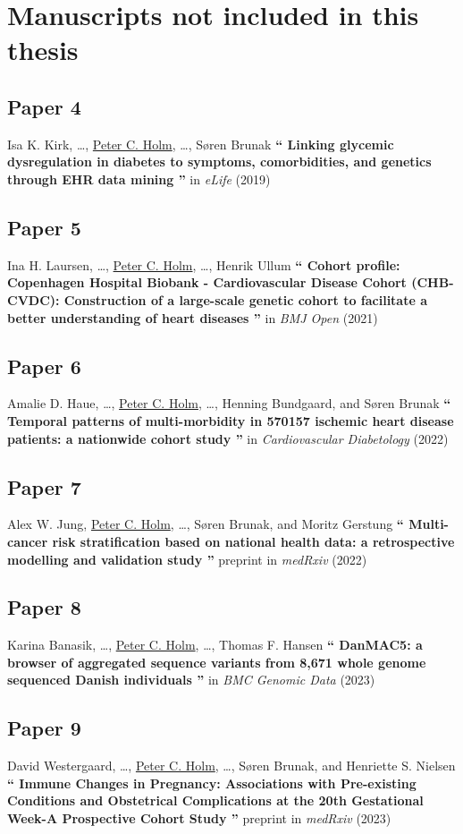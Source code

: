 \clearpage
\section{Manuscripts not included in this thesis}

\subsection{Paper 4}
Isa K. Kirk, \ldots, 
\underline{Peter C. Holm},
\ldots, Søren Brunak
\textbf{\enquote{%
    Linking glycemic dysregulation in diabetes to symptoms, 
    comorbidities, and genetics through EHR data mining
}}
in \textit{eLife} (2019)

\subsection{Paper 5}
Ina H. Laursen, \ldots, 
\underline{Peter C. Holm},
\ldots, Henrik Ullum
\textbf{\enquote{%
    Cohort profile: Copenhagen Hospital Biobank - Cardiovascular Disease Cohort
    (CHB-CVDC): Construction of a large-scale genetic cohort to facilitate a
    better understanding of heart diseases
}}
in \textit{BMJ Open} (2021)

\subsection{Paper 6}
Amalie D. Haue, \ldots, 
\underline{Peter C. Holm},
\ldots, Henning Bundgaard, and Søren Brunak
\textbf{\enquote{%
    Temporal patterns of multi-morbidity in 
    570157 ischemic heart disease patients: 
    a nationwide cohort study
}}
in \textit{Cardiovascular Diabetology} (2022)

\subsection{Paper 7}
Alex W. Jung, 
\underline{Peter C. Holm}, \ldots, 
Søren Brunak, and 
Moritz Gerstung
\textbf{\enquote{%
    Multi-cancer risk stratification based on national health data: a
    retrospective modelling and validation study
}}
preprint in \textit{medRxiv} (2022)

\subsection{Paper 8}
Karina Banasik, \ldots, 
\underline{Peter C. Holm}, \ldots, 
Thomas F. Hansen
\textbf{\enquote{%
    DanMAC5: a browser of aggregated sequence variants from 8,671 whole genome
    sequenced Danish individuals
}}
in \textit{BMC Genomic Data} (2023)

\subsection{Paper 9}
David Westergaard, \ldots, 
\underline{Peter C. Holm}, \ldots, 
Søren Brunak, and 
Henriette S. Nielsen
\textbf{\enquote{%
    Immune Changes in Pregnancy: Associations with Pre-existing Conditions and
    Obstetrical Complications at the 20th Gestational Week-A Prospective Cohort
    Study
}}
preprint in \textit{medRxiv} (2023)

